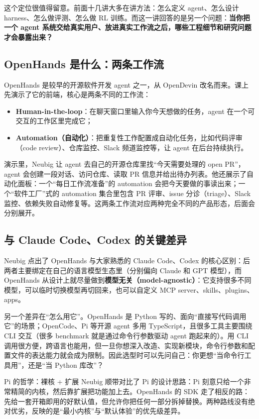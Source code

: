 \documentclass[a4paper]{article}
\begin{document}
这个定位很值得留意。前面十几讲大多在讲方法：怎么定义 agent、怎么设计 harness、怎么做评测、怎么做 RL 训练。而这一讲回答的是另一个问题：\textbf{当你把一个 agent 系统交给真实用户、放进真实工作流之后，哪些工程细节和研究问题才会暴露出来？}

\subsection{OpenHands 是什么：两条工作流}

OpenHands 是较早的开源软件开发 agent 之一，从 OpenDevin 改名而来。课上先演示了它的前端，核心是两条不同的工作流：

\begin{itemize}
\item \textbf{Human-in-the-loop}：在聊天窗口里输入你今天想做的任务，agent 在一个可交互的工作区里完成它；
\item \textbf{Automation（自动化）}：把重复性工作配置成自动化任务，比如代码评审（code review）、仓库监控、Slack 频道监控等，让 agent 在后台持续执行。
\end{itemize}

演示里，Neubig 让 agent 去自己的开源仓库里找“今天需要处理的 open PR”，agent 会创建一段对话、访问仓库、读取 PR 信息并给出待办列表。他还展示了自动化面板：一个“每日工作流准备”的 automation 会把今天要做的事读出来；一个“软件工厂”式的 automation 集合里包含 PR 评审、issue 分诊（triage）、Slack 监控、依赖失败自动修复等。这两条工作流对应两种完全不同的产品形态，后面会分别展开。

\subsection{与 Claude Code、Codex 的关键差异}

Neubig 点出了 OpenHands 与大家熟悉的 Claude Code、Codex 的核心区别：后两者主要绑定在自己的语言模型生态里（分别偏向 Claude 和 GPT 模型），而 OpenHands 从设计上就尽量做到\textbf{模型无关（model-agnostic）}：它支持很多不同模型，可以临时切换模型再切回来，也可以自定义 MCP server、skills、plugins、apps。

另一个差异在“怎么用它”。OpenHands 是 Python 写的、面向“直接写代码调用它”的场景；OpenCode、Pi 等开源 agent 多用 TypeScript，且很多工具主要围绕 CLI 交互（很多 benchmark 就是通过命令行参数驱动 agent 跑起来的）。用 CLI 调用很方便，跨语言也能用，但一旦你想深入改造、实现新模块，命令行参数和配置文件的表达能力就会成为限制。因此选型时可以先问自己：你更想“当命令行工具用”，还是“当 Python 库改”？

\begin{knowledgebox}{Pi 的哲学：裸核 + 扩展}
Neubig 顺带对比了 Pi 的设计思路：Pi 刻意只给一个非常精简的内核，然后靠扩展把功能加上去。OpenHands 的 SDK 走了相反的路：先给一套开箱即用的好默认值，但允许你把任何一部分拆掉替换。两种路线没有绝对优劣，反映的是“最小内核”与“默认体验”的优先级差异。
\end{knowledgebox}
\end{document}
